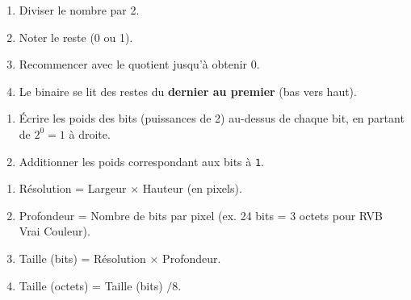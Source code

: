 \documentclass[11pt]{article}
\begin{document}
\begin{methode}
\begin{enumerate}
  \item Diviser le nombre par 2.
  \item Noter le reste (0 ou 1).
  \item Recommencer avec le quotient jusqu'à obtenir 0.
  \item Le binaire se lit des restes du \textbf{dernier au premier} (bas vers haut).
\end{enumerate}
\end{methode}

\begin{methode}
\begin{enumerate}
  \item Écrire les poids des bits (puissances de 2) au-dessus de chaque bit, en partant de $2^0=1$ à droite.
  \item Additionner les poids correspondant aux bits à \texttt{1}.
\end{enumerate}
\end{methode}

\begin{methode}
\begin{enumerate}
  \item Résolution = Largeur $\times$ Hauteur (en pixels).
  \item Profondeur = Nombre de bits par pixel (ex. 24 bits = 3 octets pour RVB Vrai Couleur).
  \item Taille (bits) = Résolution $\times$ Profondeur.
  \item Taille (octets) = Taille (bits) $/ 8$.
\end{enumerate}
\end{methode}
\end{document}
